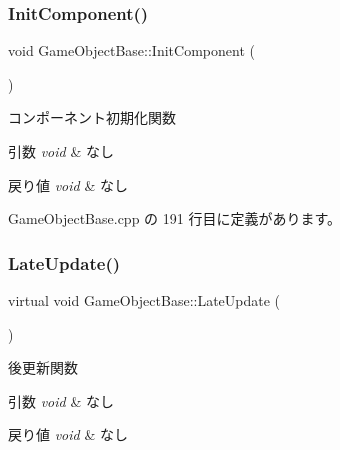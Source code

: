 \subsubsection{\texorpdfstring{Init\+Component()}{InitComponent()}}
{\footnotesize\ttfamily void Game\+Object\+Base\+::\+Init\+Component (\begin{DoxyParamCaption}{ }\end{DoxyParamCaption})\hspace{0.3cm}{\ttfamily [private]}}



コンポーネント初期化関数 


\begin{DoxyParams}{引数}
{\em void} & なし \\
\hline
\end{DoxyParams}

\begin{DoxyRetVals}{戻り値}
{\em void} & なし \\
\hline
\end{DoxyRetVals}


 Game\+Object\+Base.\+cpp の 191 行目に定義があります。

\mbox{\label{class_game_object_base_a4536510d363ce3ee4c911feaa8519821}} 
\subsubsection{\texorpdfstring{Late\+Update()}{LateUpdate()}}
{\footnotesize\ttfamily virtual void Game\+Object\+Base\+::\+Late\+Update (\begin{DoxyParamCaption}{ }\end{DoxyParamCaption})\hspace{0.3cm}{\ttfamily [pure virtual]}}



後更新関数 


\begin{DoxyParams}{引数}
{\em void} & なし \\
\hline
\end{DoxyParams}

\begin{DoxyRetVals}{戻り値}
{\em void} & なし \\
\hline
\end{DoxyRetVals}


